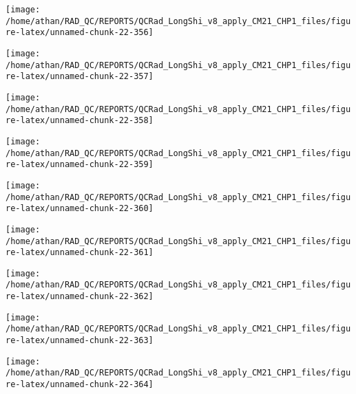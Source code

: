 \documentclass[
  10pt,
  a4paper,oneside]{article}
\begin{document}
\begin{center}\texttt{[image: /home/athan/RAD\_QC/REPORTS/QCRad\_LongShi\_v8\_apply\_CM21\_CHP1\_files/figure-latex/unnamed-chunk-22-356]} \end{center}

\begin{center}\texttt{[image: /home/athan/RAD\_QC/REPORTS/QCRad\_LongShi\_v8\_apply\_CM21\_CHP1\_files/figure-latex/unnamed-chunk-22-357]} \end{center}

\begin{center}\texttt{[image: /home/athan/RAD\_QC/REPORTS/QCRad\_LongShi\_v8\_apply\_CM21\_CHP1\_files/figure-latex/unnamed-chunk-22-358]} \end{center}

\begin{center}\texttt{[image: /home/athan/RAD\_QC/REPORTS/QCRad\_LongShi\_v8\_apply\_CM21\_CHP1\_files/figure-latex/unnamed-chunk-22-359]} \end{center}

\begin{center}\texttt{[image: /home/athan/RAD\_QC/REPORTS/QCRad\_LongShi\_v8\_apply\_CM21\_CHP1\_files/figure-latex/unnamed-chunk-22-360]} \end{center}

\begin{center}\texttt{[image: /home/athan/RAD\_QC/REPORTS/QCRad\_LongShi\_v8\_apply\_CM21\_CHP1\_files/figure-latex/unnamed-chunk-22-361]} \end{center}

\begin{center}\texttt{[image: /home/athan/RAD\_QC/REPORTS/QCRad\_LongShi\_v8\_apply\_CM21\_CHP1\_files/figure-latex/unnamed-chunk-22-362]} \end{center}

\begin{center}\texttt{[image: /home/athan/RAD\_QC/REPORTS/QCRad\_LongShi\_v8\_apply\_CM21\_CHP1\_files/figure-latex/unnamed-chunk-22-363]} \end{center}

\begin{center}\texttt{[image: /home/athan/RAD\_QC/REPORTS/QCRad\_LongShi\_v8\_apply\_CM21\_CHP1\_files/figure-latex/unnamed-chunk-22-364]} \end{center}
\end{document}
